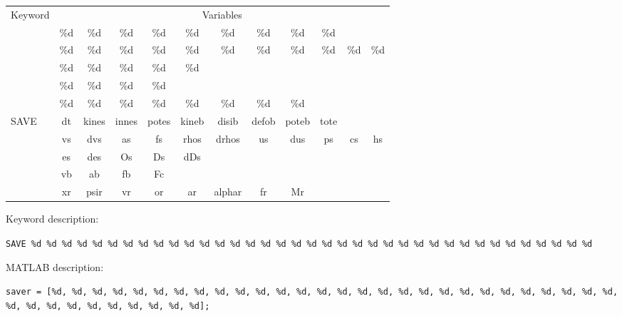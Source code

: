 \begin{tabular}{|l|c|c|c|c|c|c|c|c|c|c|c|}
\hline
\multirow{6}{*}{Keyword} & \multicolumn{11}{c|}{Variables} \\ \cline{2-12}
& \%d & \%d & \%d & \%d & \%d & \%d & \%d & \%d & \%d \\ \cline{2-12}%
& \%d & \%d & \%d & \%d & \%d & \%d & \%d & \%d & \%d & \%d & \%d \\ \cline{2-12} 
& \%d & \%d & \%d & \%d & \%d & \multicolumn{6}{c}{} \\ \cline{2-6}
& \%d & \%d & \%d & \%d & \multicolumn{7}{c}{} \\ \cline{2-9}
& \%d & \%d & \%d & \%d & \%d & \%d & \%d & \%d\\ \cline{1-10} %
\multirow{5}{*}{SAVE} & dt & kines & innes & potes & kineb & disib & defob & poteb & tote \\ \cline{2-12} %
& vs & dvs & as & fs & rhos & drhos & us & dus & ps & cs & hs \\ \cline{2-12}
& es & des & Os & Ds & dDs \\ \cline{2-6} %
& vb & ab & fb & Fc \\ \cline{2-9} %
& xr & psir & vr & or & ar & alphar & fr & Mr \\ \cline{1-9} %
\end{tabular}

Keyword description:

\begin{tcolorbox}
\texttt{SAVE \%d \%d \%d \%d \%d \%d \%d \%d \%d \%d \%d \%d \%d \%d \%d \%d \%d \%d \%d \%d \%d \%d \%d \%d \%d \%d \%d \%d \%d \%d \%d \%d \%d \%d \%d \%d \%d}
\end{tcolorbox}

MATLAB description:

\begin{tcolorbox}
\texttt{saver = [\%d, \%d, \%d, \%d, \%d, \%d, \%d, \%d, \%d, \%d, \%d, \%d, \%d, \%d, \%d, \%d, \%d, \%d, \%d, \%d, \%d, \%d, \%d, \%d, \%d, \%d, \%d, \%d, \%d, \%d, \%d, \%d, \%d, \%d, \%d, \%d, \%d, \%d];}
\end{tcolorbox}

